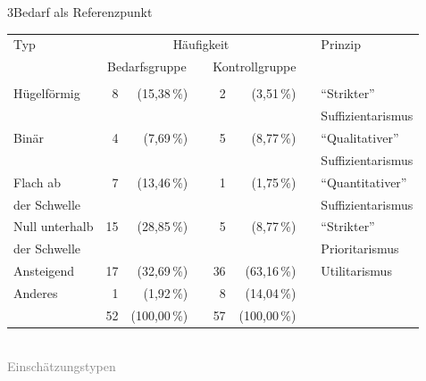 \documentclass[xcolor=table,9pt,aspectratio=169]{beamer}
\begin{document}
\begin{frame}{\vspace*{10mm}3\hspace*{1em}Bedarf als Referenzpunkt}
\begin{center}
   \begin{tabular}[h]{lrrrrrrl}
      \arrayrulecolor{blue2}
      \hline
      Typ              & \multicolumn{5}{c}{Häufigkeit}      &   & Prinzip                                                              \\
      \cline{2-6}
                       & \multicolumn{2}{c}{Bedarfsgruppe}   &   & \multicolumn{2}{c}{Kontrollgruppe}   &   &                           \\
      \hline\hline\\[-0.5em]
      Hügelförmig      &  8   &  (15,38\,\%)                 &   &  2   &   (3,51\,\%)                  &   & \enquote{Strikter}        \\
                       &      &                              &   &      &                               &   & Suffizientarismus         \\[1ex]
      Binär            &  4   &   (7,69\,\%)                 &   &  5   &   (8,77\,\%)                  &   & \enquote{Qualitativer}    \\
                       &      &                              &   &      &                               &   & Suffizientarismus         \\[1ex]
      Flach ab         &  7   &  (13,46\,\%)                 &   &  1   &   (1,75\,\%)                  &   & \enquote{Quantitativer}   \\
      der Schwelle     &      &                              &   &      &                               &   & Suffizientarismus         \\[1ex]
      Null unterhalb   & 15   &  (28,85\,\%)                 &   &  5   &   (8,77\,\%)                  &   & \enquote{Strikter}        \\
      der Schwelle     &      &                              &   &      &                               &   & Prioritarismus            \\[1ex]
      Ansteigend       & 17   &  (32,69\,\%)                 &   & 36   &  (63,16\,\%)                  &   & Utilitarismus             \\[1ex]
      Anderes          &  1   &   (1,92\,\%)                 &   &  8   &  (14,04\,\%)                  &   &                           \\
      \hline
                       & 52   & (100,00\,\%)                 &   & 57   & (100,00\,\%)                  &   &                           \\
      \hline
   \end{tabular}\\
   \smallskip
   \textcolor{gray}{Einschätzungstypen}
\end{center}
\end{frame}
\end{document}
